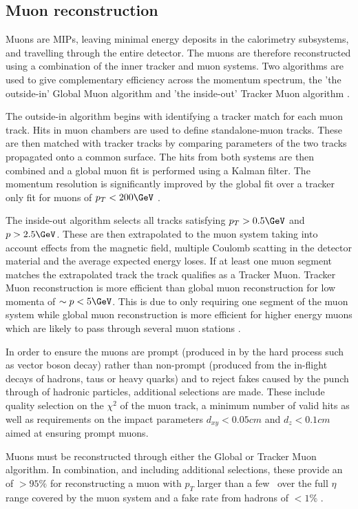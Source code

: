 \subsection{Muon reconstruction}
\label{muon_reco}
Muons are MIPs, leaving minimal energy deposits in the calorimetry subsystems, and travelling through
the entire detector. The muons are therefore reconstructed using a combination of the inner tracker
and muon systems. Two algorithms are used to give complementary efficiency across the momentum spectrum,
the 'the outside-in' Global Muon algorithm and 'the inside-out' Tracker 
Muon algorithm \cite{muon_reco}.

The outside-in algorithm begins with identifying a tracker match for each muon track. Hits in muon
chambers are used to define standalone-muon tracks. These are then matched with tracker tracks
by comparing parameters of the two tracks propagated onto a common surface. The hits from
both systems are then combined and a global muon fit is performed using a Kalman filter. The momentum 
resolution is significantly improved by the global fit over a tracker only fit for muons of $p_T < 200\GeV$
 \cite{CMS,muon_reco_cosmic}. 

The inside-out algorithm selects all tracks satisfying $p_T > 0.5\GeV$ and $p > 2.5\GeV$. These are then 
extrapolated to the muon system taking into account effects from the magnetic field, multiple Coulomb scatting
in the detector material and the average expected energy loses. If at least one muon segment matches 
the extrapolated track the track qualifies as a Tracker Muon. Tracker Muon reconstruction is more efficient
than global muon reconstruction for low momenta of $\sim p< 5\GeV$. This is due to only requiring one segment
of the muon system while global muon reconstruction is more efficient for higher energy muons which are likely
to pass through several muon stations \cite{muon_reco}.

In order to ensure the muons are prompt (produced in by the hard process such as vector boson decay) rather
than non-prompt (produced from the in-flight decays of hadrons, taus or heavy quarks) and to reject fakes
caused by the punch through of hadronic particles, additional selections are made. These include quality
selection on the $\chi^2$ of the muon track, a minimum number of valid hits as well as requirements
on the impact parameters $d_{xy} < 0.05 cm$ and $d_{z} < 0.1 cm$ aimed at ensuring prompt muons.

Muons must be reconstructed through either the Global or Tracker Muon algorithm. In combination, and
including additional selections, these provide an of $>95\%$ for
reconstructing a muon with $p_T$ larger than a few \GeV~over the full $\eta$ range covered by the
muon system and a fake rate from hadrons of $<1\%$ \cite{muon_reco}.

